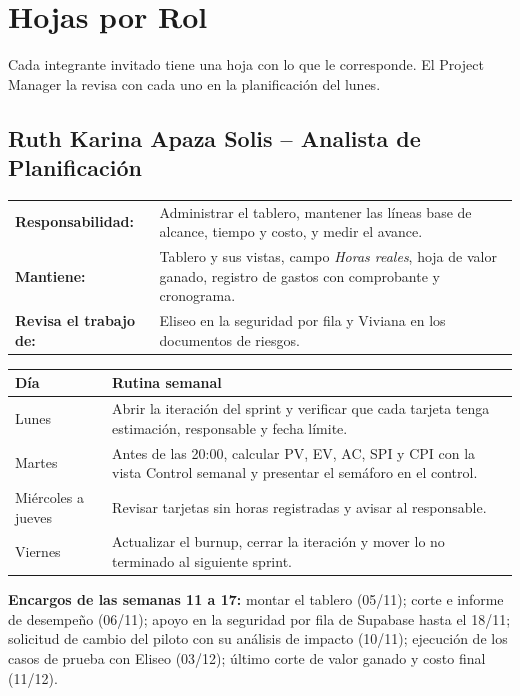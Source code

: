 \documentclass[11pt,a4paper]{article}
\begin{document}
\clearpage
\section{Hojas por Rol}
Cada integrante invitado tiene una hoja con lo que le corresponde. El Project Manager la revisa con cada uno en la planificación del lunes.

\subsection{Ruth Karina Apaza Solis -- Analista de Planificación}
{\small
\noindent\begin{tabularx}{\textwidth}{@{}P{3.4cm} L@{}}
\toprule
\textbf{Responsabilidad:} & Administrar el tablero, mantener las líneas base de alcance, tiempo y costo, y medir el avance. \\
\textbf{Mantiene:} & Tablero y sus vistas, campo \textit{Horas reales}, hoja de valor ganado, registro de gastos con comprobante y cronograma. \\
\textbf{Revisa el trabajo de:} & Eliseo en la seguridad por fila y Viviana en los documentos de riesgos. \\
\bottomrule
\end{tabularx}
}

\vspace{0.1cm}
{\small
{}
\noindent\begin{tabularx}{\textwidth}{@{}P{2.4cm} L@{}}
\toprule
{}
\textbf{Día} & \textbf{Rutina semanal} \\
\midrule
Lunes & Abrir la iteración del sprint y verificar que cada tarjeta tenga estimación, responsable y fecha límite. \\
Martes & Antes de las 20:00, calcular PV, EV, AC, SPI y CPI con la vista Control semanal y presentar el semáforo en el control. \\
Miércoles a jueves & Revisar tarjetas sin horas registradas y avisar al responsable. \\
Viernes & Actualizar el burnup, cerrar la iteración y mover lo no terminado al siguiente sprint. \\
\bottomrule
\end{tabularx}
}

\vspace{0.1cm}
\noindent\textbf{Encargos de las semanas 11 a 17:} montar el tablero (05/11); corte e informe de desempeño (06/11); apoyo en la seguridad por fila de Supabase hasta el 18/11; solicitud de cambio del piloto con su análisis de impacto (10/11); ejecución de los casos de prueba con Eliseo (03/12); último corte de valor ganado y costo final (11/12).
\end{document}
